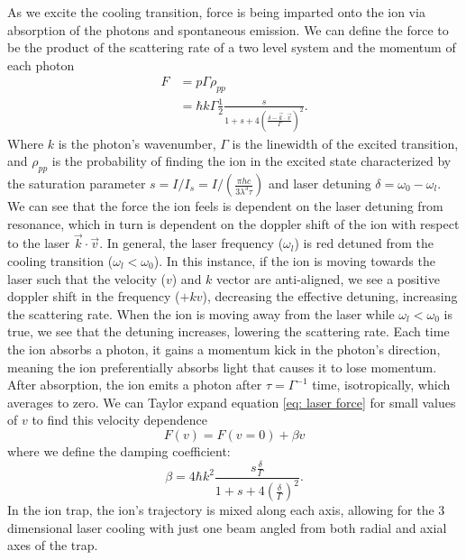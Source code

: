 As we excite the cooling transition, force is being imparted onto the ion via absorption of the photons and spontaneous emission. We can define the force to be the product of the scattering rate of a two level system and the momentum of each photon
\begin{align}
	F & = p \Gamma \rho_{pp} \nonumber \\
	& = \hbar k \Gamma \frac{1}{2} \frac{s}{1+s+4\left(\frac{\delta-\vec{k}\cdot \vec{v}}{\Gamma}\right)^2}. \label{eq: laser force}
\end{align}
Where $k$ is the photon's wavenumber, $\Gamma$ is the linewidth of the excited transition, and $\rho_{pp}$ is the probability of finding the ion in the excited  state characterized by the saturation parameter $s = I/I_s=I/(\frac{\pi h c}{3 \lambda^3 \tau})$ and laser detuning $\delta=\omega_0-\omega_l$. We can see that the force the ion feels is dependent on the laser detuning from resonance, which in turn is dependent on the doppler shift of the ion with respect to the laser $\vec{k} \cdot \vec{v}$. In general, the laser frequency ($\omega_l$) is red detuned from the cooling transition ($\omega_l < \omega_0$). In this instance, if the ion is moving towards the laser such that the velocity ($v$) and $k$ vector are anti-aligned, we see a positive doppler shift in the frequency ($+kv$), decreasing the effective detuning, increasing the scattering rate. When the ion is moving away from the laser while $\omega_l < \omega_0$ is true, we see that the detuning increases, lowering the scattering rate. Each time the ion absorbs a photon, it gains a momentum kick in the photon's direction, meaning the ion preferentially absorbs light that causes it to lose momentum. After absorption, the ion emits a photon after $\tau=\Gamma^{-1}$ time, isotropically, which averages to zero. We can Taylor expand equation \ref{eq: laser force} for small values of $v$ to find this velocity dependence
\begin{equation*}
	F(v) = F(v=0) + \beta v
\end{equation*}
where we define the damping coefficient:
\begin{equation*}
	\beta= 4 \hbar k^2 \frac{s \frac{\delta}{\Gamma}}{1+s+4\left(\frac{\delta}{\Gamma}\right)^2}.
\end{equation*}
In the ion trap, the ion's trajectory is mixed along each axis, allowing for the 3 dimensional laser cooling with just one beam angled from both radial and axial axes of the trap.

